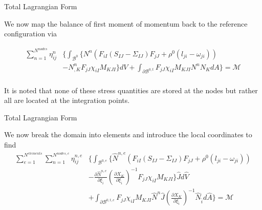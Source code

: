 \documentclass[11pt]{beamer}
\begin{document}
\begin{frame}{Total Lagrangian Form}

We now map the balance of first moment of momentum back to the reference configuration via

\begin{align*}
\sum_{n=1}^{N^{nodes}} \eta_{ij}^n &\bigg\{\int_{\mathcal{B}^{0}}  \bigg\{N^n\left(F_{iI} \left(S_{IJ}-\Sigma_{IJ}\right) F_{jJ} + \rho^0\left(l_{ji} - \omega_{ji} \right)\right)\\
&  - N_{,K}^n F_{jJ} \chi_{iI}  M_{KJI} \bigg\} dV + \int_{\partial \mathcal{B}^{0,t}} F_{jJ} \chi_{iI}  M_{KJI} N^n N_{K} dA \bigg\} = \mathcal{M}\\
\end{align*}

It is noted that none of these stress quantities are stored at the nodes but rather all are located at the integration points.

\end{frame}

\begin{frame}{Total Lagrangian Form}

We now break the domain into elements and introduce the local coordinates to find
\begin{align*}
\sum_{e=1}^{N^{elements}}\sum_{n=1}^{N^{nodes,e}} \eta_{ij}^{n,e} &\bigg\{\int_{\mathcal{B}^{0,e}}  \bigg\{\hat{N}^{n,e} \left(F_{iI} \left(S_{IJ}-\Sigma_{IJ}\right) F_{jJ} + \rho^0\left(l_{ji} - \omega_{ji} \right)\right)\\
&  - \frac{\partial \hat{N}^{n,e}}{\partial \xi_{\hat{i}}} \left(\frac{\partial X_{K}}{\partial \xi_{\hat{i}}}\right)^{-1} F_{jJ} \chi_{iI}  M_{KJI} \bigg\} \hat{J} d\hat{V}\\
& + \int_{\partial \mathcal{B}^{0,t,e}} F_{jJ} \chi_{iI}  M_{KJI} \hat{N}^n \hat{J} \left(\frac{\partial X_{K}}{\partial \xi_{\hat{i}}}\right)^{-1} \hat{N}_{\hat{i}} d\hat{A} \bigg\}  = \mathcal{M}\\
\end{align*}

\end{frame}
\end{document}
